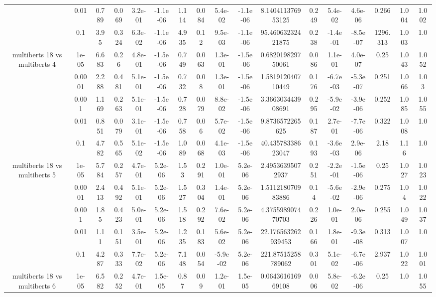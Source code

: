 \begin{tabular}{|c|c|c|c|c|c|c|c|c|c|c|c|c|c|c|c|c|}
 & 0.01 & 0.789 & 0.069 & 3.2e-01 & -1.1e-06 & 1.114 & 0.084 & 5.4e-02 & -1.1e-06 & 8.140411376953125 & 0.249 & 5.4e-02 & 4.6e-06 & 0.266 & 1.004 & 1.002 \\
 & 0.1 & 3.95 & 0.324 & 6.3e-02 & -1.1e-06 & 4.935 & 0.12 & 9.5e-03 & -1.1e-06 & 95.46063232421875 & 0.238 & -1.4e-01 & -8.5e-07 & 1296.313 & 1.003 & 1.0 \\
\hline
\multirow{5}{*}{multiberts 18 vs multiberts 4} & 1e-05 & 6.683 & 0.26 & 4.8e-01 & -1.5e-06 & 0.749 & 0.063 & 1.3e-01 & -1.5e-06 & 0.682019829750061 & 0.086 & 1.1e-01 & 4.0e-07 & 0.25 & 1.043 & 1.052 \\
 & 0.0001 & 2.288 & 0.481 & 5.1e-01 & -1.5e-06 & 0.732 & 0.08 & 1.3e-01 & -1.5e-06 & 1.581912040710449 & 0.176 & -6.7e-03 & -5.3e-07 & 0.251 & 1.066 & 1.03 \\
 & 0.001 & 1.169 & 0.263 & 5.1e-01 & -1.5e-06 & 0.728 & 0.079 & 8.8e-02 & -1.5e-06 & 3.366303443908691 & 0.295 & -5.9e-02 & -3.9e-06 & 0.252 & 1.085 & 1.055 \\
 & 0.01 & 0.851 & 0.079 & 3.1e-01 & -1.5e-06 & 0.758 & 0.06 & 5.7e-02 & -1.5e-06 & 9.8736572265625 & 0.187 & 2.7e-01 & -7.7e-06 & 0.322 & 1.008 & 1.0 \\
 & 0.1 & 4.782 & 0.565 & 5.1e-02 & -1.5e-06 & 1.089 & 0.068 & 4.1e-03 & -1.5e-06 & 40.43578338623047 & 0.193 & -3.6e-03 & 2.9e-06 & 2.18 & 1.16 & 1.0 \\
\hline
\multirow{5}{*}{multiberts 18 vs multiberts 5} & 1e-05 & 5.784 & 0.257 & 4.7e-01 & 5.2e-06 & 1.53 & 0.291 & 1.0e-01 & 5.2e-06 & 2.49536395072937 & 0.251 & -2.2e-01 & -1.5e-06 & 0.25 & 1.027 & 1.023 \\
 & 0.0001 & 2.413 & 0.492 & 5.1e-01 & 5.2e-06 & 1.527 & 0.304 & 1.4e-01 & 5.2e-06 & 1.511218070983886 & 0.14 & -5.6e-02 & -2.9e-06 & 0.275 & 1.04 & 1.022 \\
 & 0.001 & 1.85 & 0.423 & 5.0e-01 & 5.2e-06 & 1.518 & 0.292 & 7.6e-02 & 5.2e-06 & 4.375598907470703 & 0.226 & 1.0e-01 & 2.0e-06 & 0.255 & 1.049 & 1.037 \\
 & 0.01 & 1.11 & 0.151 & 3.5e-01 & 5.2e-06 & 1.235 & 0.183 & 5.6e-02 & 5.2e-06 & 22.176563262939453 & 0.166 & 1.8e-01 & -9.3e-08 & 0.313 & 1.007 & 1.0 \\
 & 0.1 & 4.287 & 0.333 & 7.7e-02 & 5.2e-06 & 7.148 & 0.054 & -5.9e-02 & 5.2e-06 & 221.87515258789062 & 0.301 & 5.1e-02 & -6.7e-06 & 2.937 & 1.022 & 1.001 \\
\hline
\multirow{5}{*}{multiberts 18 vs multiberts 6} & 1e-05 & 6.582 & 0.252 & 4.7e-01 & 1.5e-05 & 0.87 & 0.09 & 1.2e-01 & 1.5e-05 & 0.064361616969108 & 0.006 & 5.8e-02 & -6.2e-06 & 0.25 & 1.0 & 1.055 \\

\end{tabular}
